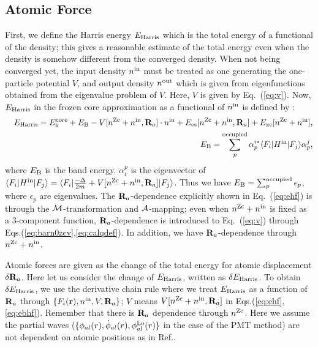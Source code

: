 \documentclass[a4paper,10pt,aip,onecolumn,amsmath,amssymb,floatfix,rmp]{revtex4-1}
\newcommand{\bfr}{{\bf r}}
\newcommand{\bfR}{{\bf R}}
\def\calR{{\cal A}}
\newcommand{\req}[1]{\mbox{Eq.~\!(\ref{#1})}}
\def\nzc{n^{\rm Zc}}
\def\MM{{\cal M}}
\def\ehf{E_{\rm Harris}}
\def\nin{n^{\rm in}}
\def\nout{n^{\rm out}}
\def\Vin{V}
\def\philo{{\phi}^{\rm Lo}_{al}}
\begin{document}
\begin{widetext}
\subsection{Atomic Force}
\label{sec:force}
First, we define the Harris energy $\ehf$ \cite{molforce,harris85} 
which is the total energy of a functional of the density; this gives
a reasonable estimate of the total energy even when the density is
somehow different from the converged density.
When not being converged yet, the input density $\nin$
must be treated as one generating the one-particle potential $V$,
and output density $\nout$ which is given from eigenfunctions
obtained from the eigenvalue problem of $V$. Here, $
V$ is given by \req{eq:v}. Now, $\ehf$ in the frozen core
approximation as a functional of $\nin$ is defined by \cite{molforce}:
\begin{eqnarray}
&&\ehf = E_{\rm k}^{\rm core} + E_{\rm B} - V[\nzc+\nin,\bfR_a] \cdot \nin 
+ E_{\rm es}[\nzc+\nin,\bfR_a] + E_{\rm xc}[\nzc+\nin],
\label{eq:ehf} \\
&&E_{\rm B} = \sum_p^{\rm occupied}
\alpha_{p}^{i*} 
\langle F_i|H^{\rm in}|F_j \rangle 
\alpha_p^j,
\label{eq:ebhf}
\end{eqnarray}
where $E_{\rm B}$ is the band energy.
$\alpha_i^p$ is the eigenvector of 
$\langle F_i|H^{\rm in}|F_j \rangle=
\langle F_i| \frac{-\Delta}{2m} + V[\nzc+\nin,\bfR_a] |F_j\rangle$.
Thus we have $E_{\rm B}=\sum^{\rm occupied}_p \epsilon_p$, where $\epsilon_p$ are eigenvalues.
The $\bfR_a$-dependence explicitly shown in \req{eq:ehf} is
through the $\MM$-transformation and $\calR$-mapping;
even when $\nzc+\nin$ is fixed as a 3-component function,
$\bfR_a$-dependence is introduced to \req{eq:v} through Eqs.(\ref{eq:barn0zcv},\ref{eq:calqdef}).
In addition, we have $\bfR_a$-dependence through $\nzc+\nin$.

Atomic forces are given as the change of the total energy 
for atomic displacement $\delta \bfR_a$.
Here let us consider the change of $\ehf$, written as $\delta \ehf$.
To obtain $\delta \ehf$, we use the derivative chain rule where we
treat $\ehf$ as a function of $\bfR_a$ through
$\{F_i(\bfr), \nin, \Vin, \bfR_a\}$; $\Vin$ means $V[\nzc+\nin,\bfR_a]$ in 
Eqs.(\ref{eq:ehf},\ref{eq:ebhf}).
Remember that there is $\bfR_a$ dependence through $\nzc$.
Here we assume the partial waves
($\{\phi_{al}(r),\dot{\phi}_{al}(r),\philo(r) \}$ in the case of the PMT
method) are not dependent on atomic positions as in Ref.\cite{molforce}.


\end{widetext}
\end{document}

